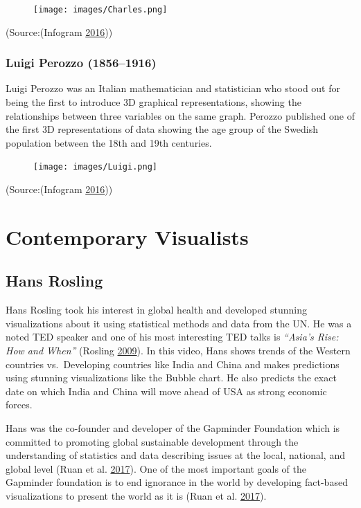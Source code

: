 \documentclass[]{book}
\begin{document}
\begin{figure}
\centering
\texttt{[image: images/Charles.png]}
\caption{}
\end{figure}

(Source:(Infogram \protect\hyperlink{ref-history_viz}{2016}))

\subsubsection{Luigi Perozzo (1856--1916)}\label{luigi-perozzo-18561916}

Luigi Perozzo was an Italian mathematician and statistician who stood
out for being the first to introduce 3D graphical representations,
showing the relationships between three variables on the same graph.
Perozzo published one of the first 3D representations of data showing
the age group of the Swedish population between the 18th and 19th
centuries.

\begin{figure}
\centering
\texttt{[image: images/Luigi.png]}
\caption{}
\end{figure}

(Source:(Infogram \protect\hyperlink{ref-history_viz}{2016}))

\section{Contemporary Visualists}\label{contemporary-visualists}

\subsection{Hans Rosling}\label{hans-rosling}

Hans Rosling took his interest in global health and developed stunning
visualizations about it using statistical methods and data from the UN.
He was a noted TED speaker and one of his most interesting TED talks is
\emph{``Asia's Rise: How and When''} (Rosling
\protect\hyperlink{ref-hans}{2009}). In this video, Hans shows trends of
the Western countries vs.~Developing countries like India and China and
makes predictions using stunning visualizations like the Bubble chart.
He also predicts the exact date on which India and China will move ahead
of USA as strong economic forces.

Hans was the co-founder and developer of the Gapminder Foundation which
is committed to promoting global sustainable development through the
understanding of statistics and data describing issues at the local,
national, and global level (Ruan et al.
\protect\hyperlink{ref-gapminder}{2017}). One of the most important
goals of the Gapminder foundation is to end ignorance in the world by
developing fact-based visualizations to present the world as it is (Ruan
et al. \protect\hyperlink{ref-gapminder}{2017}).
\end{document}
